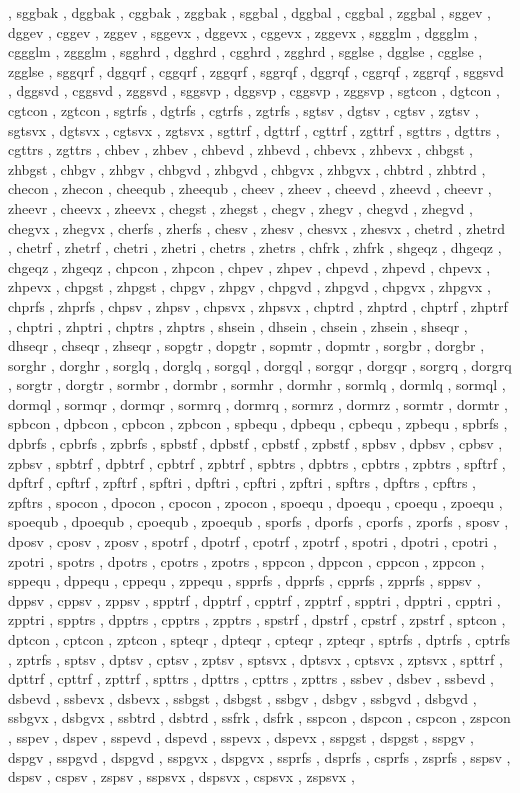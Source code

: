 \documentclass{article}
\begin{document}
, sggbak , dggbak , cggbak , zggbak , sggbal , dggbal , cggbal , zggbal , sggev , dggev , cggev , zggev , sggevx , dggevx , cggevx , zggevx , sggglm , dggglm , cggglm , zggglm , sgghrd , dgghrd , cgghrd , zgghrd , sgglse , dgglse , cgglse , zgglse , sggqrf , dggqrf , cggqrf , zggqrf , sggrqf , dggrqf , cggrqf , zggrqf , sggsvd , dggsvd , cggsvd , zggsvd , sggsvp , dggsvp , cggsvp , zggsvp , sgtcon , dgtcon , cgtcon , zgtcon , sgtrfs , dgtrfs , cgtrfs , zgtrfs , sgtsv , dgtsv , cgtsv , zgtsv , sgtsvx , dgtsvx , cgtsvx , zgtsvx , sgttrf , dgttrf , cgttrf , zgttrf , sgttrs , dgttrs , cgttrs , zgttrs , chbev , zhbev , chbevd , zhbevd , chbevx , zhbevx , chbgst , zhbgst , chbgv , zhbgv , chbgvd , zhbgvd , chbgvx , zhbgvx , chbtrd , zhbtrd , checon , zhecon , cheequb , zheequb , cheev , zheev , cheevd , zheevd , cheevr , zheevr , cheevx , zheevx , chegst , zhegst , chegv , zhegv , chegvd , zhegvd , chegvx , zhegvx , cherfs , zherfs , chesv , zhesv , chesvx , zhesvx , chetrd , zhetrd , chetrf , zhetrf , chetri , zhetri , chetrs , zhetrs , chfrk , zhfrk , shgeqz , dhgeqz , chgeqz , zhgeqz , chpcon , zhpcon , chpev , zhpev , chpevd , zhpevd , chpevx , zhpevx , chpgst , zhpgst , chpgv , zhpgv , chpgvd , zhpgvd , chpgvx , zhpgvx , chprfs , zhprfs , chpsv , zhpsv , chpsvx , zhpsvx , chptrd , zhptrd , chptrf , zhptrf , chptri , zhptri , chptrs , zhptrs , shsein , dhsein , chsein , zhsein , shseqr , dhseqr , chseqr , zhseqr , sopgtr , dopgtr , sopmtr , dopmtr , sorgbr , dorgbr , sorghr , dorghr , sorglq , dorglq , sorgql , dorgql , sorgqr , dorgqr , sorgrq , dorgrq , sorgtr , dorgtr , sormbr , dormbr , sormhr , dormhr , sormlq , dormlq , sormql , dormql , sormqr , dormqr , sormrq , dormrq , sormrz , dormrz , sormtr , dormtr , spbcon , dpbcon , cpbcon , zpbcon , spbequ , dpbequ , cpbequ , zpbequ , spbrfs , dpbrfs , cpbrfs , zpbrfs , spbstf , dpbstf , cpbstf , zpbstf , spbsv , dpbsv , cpbsv , zpbsv , spbtrf , dpbtrf , cpbtrf , zpbtrf , spbtrs , dpbtrs , cpbtrs , zpbtrs , spftrf , dpftrf , cpftrf , zpftrf , spftri , dpftri , cpftri , zpftri , spftrs , dpftrs , cpftrs , zpftrs , spocon , dpocon , cpocon , zpocon , spoequ , dpoequ , cpoequ , zpoequ , spoequb , dpoequb , cpoequb , zpoequb , sporfs , dporfs , cporfs , zporfs , sposv , dposv , cposv , zposv , spotrf , dpotrf , cpotrf , zpotrf , spotri , dpotri , cpotri , zpotri , spotrs , dpotrs , cpotrs , zpotrs , sppcon , dppcon , cppcon , zppcon , sppequ , dppequ , cppequ , zppequ , spprfs , dpprfs , cpprfs , zpprfs , sppsv , dppsv , cppsv , zppsv , spptrf , dpptrf , cpptrf , zpptrf , spptri , dpptri , cpptri , zpptri , spptrs , dpptrs , cpptrs , zpptrs , spstrf , dpstrf , cpstrf , zpstrf , sptcon , dptcon , cptcon , zptcon , spteqr , dpteqr , cpteqr , zpteqr , sptrfs , dptrfs , cptrfs , zptrfs , sptsv , dptsv , cptsv , zptsv , sptsvx , dptsvx , cptsvx , zptsvx , spttrf , dpttrf , cpttrf , zpttrf , spttrs , dpttrs , cpttrs , zpttrs , ssbev , dsbev , ssbevd , dsbevd , ssbevx , dsbevx , ssbgst , dsbgst , ssbgv , dsbgv , ssbgvd , dsbgvd , ssbgvx , dsbgvx , ssbtrd , dsbtrd , ssfrk , dsfrk , sspcon , dspcon , cspcon , zspcon , sspev , dspev , sspevd , dspevd , sspevx , dspevx , sspgst , dspgst , sspgv , dspgv , sspgvd , dspgvd , sspgvx , dspgvx , ssprfs , dsprfs , csprfs , zsprfs , sspsv , dspsv , cspsv , zspsv , sspsvx , dspsvx , cspsvx , zspsvx , 
\end{document}
